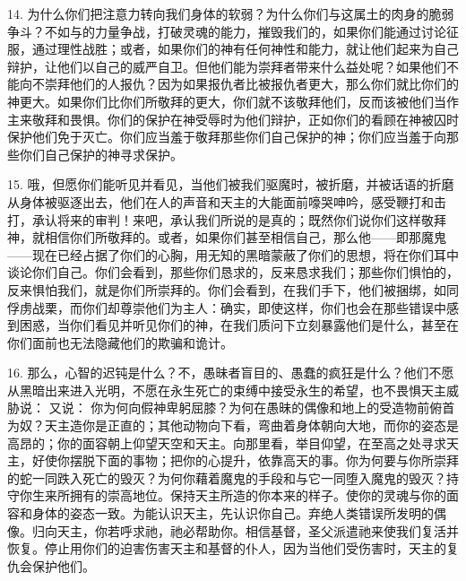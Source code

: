 14. 为什么你们把注意力转向我们身体的软弱？为什么你们与这属土的肉身的脆弱争斗？不如与的力量争战，打破灵魂的能力，摧毁我们的，如果你们能通过讨论征服，通过理性战胜；或者，如果你们的神有任何神性和能力，就让他们起来为自己辩护，让他们以自己的威严自卫。但他们能为崇拜者带来什么益处呢？如果他们不能向不崇拜他们的人报仇？因为如果报仇者比被报仇者更大，那么你们就比你们的神更大。如果你们比你们所敬拜的更大，你们就不该敬拜他们，反而该被他们当作主来敬拜和畏惧。你们的保护在神受辱时为他们辩护，正如你们的看顾在神被囚时保护他们免于灭亡。你们应当羞于敬拜那些你们自己保护的神；你们应当羞于向那些你们自己保护的神寻求保护。\par

15. 哦，但愿你们能听见并看见，当他们被我们驱魔时，被折磨，并被话语的折磨从身体被驱逐出去，他们在人的声音和天主的大能面前嚎哭呻吟，感受鞭打和击打，承认将来的审判！来吧，承认我们所说的是真的；既然你们说你们这样敬拜神，就相信你们所敬拜的。或者，如果你们甚至相信自己，那么他——即那魔鬼——现在已经占据了你们的心胸，用无知的黑暗蒙蔽了你们的思想，将在你们耳中谈论你们自己。你们会看到，那些你们恳求的，反来恳求我们；那些你们惧怕的，反来惧怕我们，就是你们所崇拜的。你们会看到，在我们手下，他们被捆绑，如同俘虏战栗，而你们却尊崇他们为主人：确实，即使这样，你们也会在那些错误中感到困惑，当你们看见并听见你们的神，在我们质问下立刻暴露他们是什么，甚至在你们面前也无法隐藏他们的欺骗和诡计。\par

16. 那么，心智的迟钝是什么？不，愚昧者盲目的、愚蠢的疯狂是什么？他们不愿从黑暗出来进入光明，不愿在永生死亡的束缚中接受永生的希望，也不畏惧天主威胁说：  又说：  你为何向假神卑躬屈膝？为何在愚昧的偶像和地上的受造物前俯首为奴？天主造你是正直的；其他动物向下看，弯曲着身体朝向大地，而你的姿态是高昂的；你的面容朝上仰望天空和天主。向那里看，举目仰望，在至高之处寻求天主，好使你摆脱下面的事物；把你的心提升，依靠高天的事。你为何要与你所崇拜的蛇一同跌入死亡的毁灭？为何你藉着魔鬼的手段和与它一同堕入魔鬼的毁灭？持守你生来所拥有的崇高地位。保持天主所造的你本来的样子。使你的灵魂与你的面容和身体的姿态一致。为能认识天主，先认识你自己。弃绝人类错误所发明的偶像。归向天主，你若呼求祂，祂必帮助你。相信基督，圣父派遣祂来使我们复活并恢复。停止用你们的迫害伤害天主和基督的仆人，因为当他们受伤害时，天主的复仇会保护他们。\par

